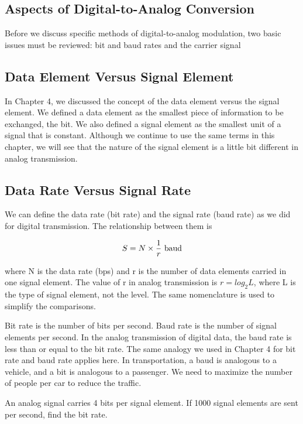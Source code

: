 \subsection{Aspects of Digital-to-Analog Conversion}
Before we discuss specific methods of digital-to-analog modulation, two basic issues must be reviewed: bit and baud rates and the carrier signal

\subsection*{Data Element Versus Signal Element}
In Chapter 4, we discussed the concept of the data element versus the signal element. We defined a data element as the smallest piece of information to be exchanged, the bit. We also defined a signal element as the smallest unit of a signal that is constant. Although we continue to use the same terms in this chapter, we will see that the nature of the signal element is a little bit different in analog transmission.

\subsection*{Data Rate Versus Signal Rate}
We can define the data rate (bit rate) and the signal rate (baud rate) as we did for digital transmission. The relationship between them is

\begin{equation}
  S = N \times \frac{1}{r} \textnormal{ baud}
\end{equation}

where N is the data rate (bps) and r is the number of data elements carried in one signal element. The value of r in analog transmission is $r = log_2L$, where L is the type of signal element, not the level. The same nomenclature is used to simplify the comparisons.

Bit rate is the number of bits per second. Baud rate is the number of signal elements per second. In the analog transmission of digital data, the baud rate is less than or equal to the bit rate. The same analogy we used in Chapter 4 for bit rate and baud rate applies here. In transportation, a baud is analogous to a vehicle, and a bit is analogous to a passenger. We need to maximize the number of people per car to reduce the traffic.

\vspace{12pt}

\begin{example}
  An analog signal carries 4 bits per signal element. If 1000 signal elements are sent per second, find the bit rate.
  \label{example5:1}
\end{example}

